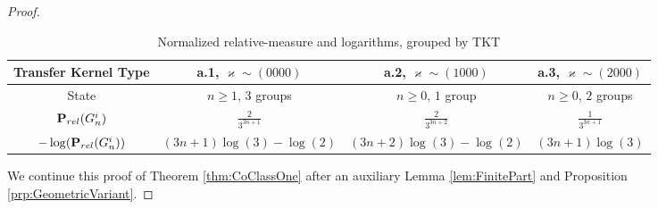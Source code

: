 \documentclass{amsart}
\theoremstyle{definition}
\theoremstyle{remark}
\begin{document}
\begin{proof}
\renewcommand{\arraystretch}{1.2}
\begin{table}[ht]
\caption{Normalized relative-measure and logarithms, grouped by TKT}
\label{tbl:RelativeMeasuresOne}
\begin{center}
\begin{tabular}{|c||c|c|c|}
\hline
 Transfer Kernel Type            & a.1, \(\varkappa\sim (0000)\)    &  a.2, \(\varkappa\sim (1000)\)   &  a.3, \(\varkappa\sim (2000)\)   \\
\hline
 State                           & \(n\ge 1\), \(3\) groups         & \(n\ge 0\), \(1\) group          & \(n\ge 0\), \(2\) groups         \\
 \({\bf P}_{rel}(G_n^i)\)        & \(\frac{2}{3^{3n+1}}\)           & \(\frac{2}{3^{3n+2}}\)           & \(\frac{1}{3^{3n+1}}\)           \\
 \(-\log({\bf P}_{rel}(G_n^i))\) & \((3n+1)\log(3)-\log(2)\)        & \((3n+2)\log(3)-\log(2)\)        & \((3n+1)\log(3)\)                \\
\hline
\end{tabular}
\end{center}
\end{table}

\noindent
We continue this proof of Theorem
\ref{thm:CoClassOne}
after an auxiliary Lemma
\ref{lem:FinitePart}
and Proposition
\ref{prp:GeometricVariant}.
\end{proof}
\end{document}
